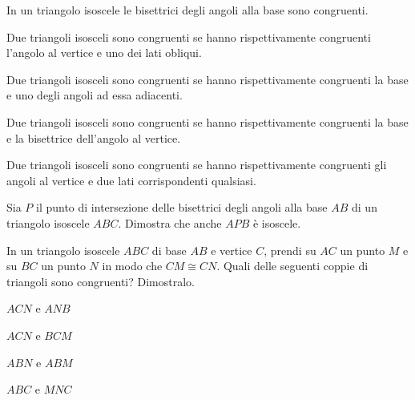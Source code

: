 \begin{multicols}{2}
\begin{esercizio}
\label{ese:2.28}
In un triangolo isoscele le bisettrici degli angoli alla base sono congruenti. 
\end{esercizio}

\begin{esercizio}
\label{ese:2.29}
Due triangoli isosceli sono congruenti se hanno rispettivamente congruenti l'angolo al vertice e uno dei lati obliqui.
\end{esercizio}

\begin{esercizio}
\label{ese:2.30}
Due triangoli isosceli sono congruenti se hanno rispettivamente congruenti la base e uno degli angoli ad essa adiacenti.
\end{esercizio}

\begin{esercizio}
\label{ese:2.31}
Due triangoli isosceli sono congruenti se hanno rispettivamente congruenti la base e la bisettrice dell'angolo al vertice.
\end{esercizio}

\begin{esercizio}
\label{ese:2.32}
Due triangoli isosceli sono congruenti se hanno rispettivamente congruenti gli angoli al vertice e due lati corrispondenti qualsiasi.
\end{esercizio}

\begin{esercizio}
\label{ese:2.33}
Sia $P$ il punto di intersezione delle bisettrici degli angoli alla base $AB$ di un triangolo isoscele $ABC$. Dimostra che anche $APB$ è isoscele.
\end{esercizio}

\begin{esercizio}
\label{ese:2.34}
In un triangolo isoscele $ABC$ di base $AB$ e vertice $C$, prendi su $AC$ un punto $M$ e su $BC$ un punto $N$ in modo che $CM\cong CN$. Quali delle seguenti coppie di triangoli sono congruenti? Dimostralo.
\begin{multicols}{2}
\begin{enumeratea}
\item $ACN$ e $ANB$
\item $ACN$ e $BCM$
\item $ABN$ e $ABM$
\item $ABC$ e $MNC$
\end{enumeratea}
\end{multicols}
\end{esercizio}


\end{multicols}

